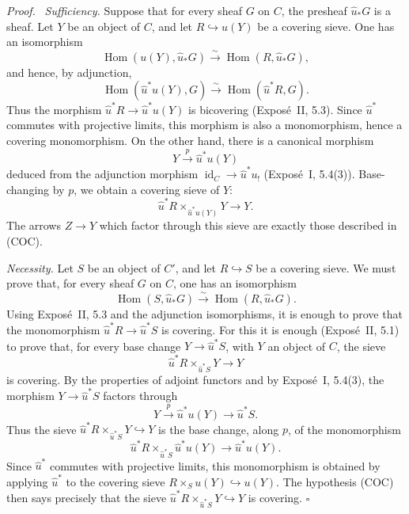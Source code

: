 \documentclass[11pt]{article}
\newcommand{\Hom}{\operatorname{Hom}}
\newcommand{\id}{\operatorname{id}}
\newcommand{\qedtext}{\hfill\(\square\)}
\newenvironment{prooftext}{\par\noindent\emph{Proof.}\ }{\par\medskip}
\begin{document}
\begin{prooftext}
\emph{Sufficiency.} Suppose that for every sheaf \(G\) on \(C\), the presheaf \(\widehat u_*G\) is a sheaf. Let \(Y\) be an object of \(C\), and let \(R\hookrightarrow u(Y)\) be a covering sieve. One has an isomorphism
\[
\Hom(u(Y),\widehat u_*G)\xrightarrow{\sim}\Hom(R,\widehat u_*G),
\]
and hence, by adjunction,
\[
\Hom(\widehat u^*u(Y),G)\xrightarrow{\sim}\Hom(\widehat u^*R,G).
\]
Thus the morphism \(\widehat u^*R\to\widehat u^*u(Y)\) is bicovering (Expos\'e~II, 5.3). Since \(\widehat u^*\) commutes with projective limits, this morphism is also a monomorphism, hence a covering monomorphism. On the other hand, there is a canonical morphism
\[
Y\xrightarrow{p}\widehat u^*u(Y)
\]
deduced from the adjunction morphism \(\id_C\to\widehat u^*u_!\) (Expos\'e~I, 5.4(3)). Base-changing by \(p\), we obtain a covering sieve of \(Y\):
\[
\widehat u^*R\times_{\widehat u^*u(Y)}Y\longrightarrow Y.
\]
The arrows \(Z\to Y\) which factor through this sieve are exactly those described in (COC).

\emph{Necessity.} Let \(S\) be an object of \(C'\), and let \(R\hookrightarrow S\) be a covering sieve. We must prove that, for every sheaf \(G\) on \(C\), one has an isomorphism
\[
\Hom(S,\widehat u_*G)\xrightarrow{\sim}\Hom(R,\widehat u_*G).
\]
Using Expos\'e~II, 5.3 and the adjunction isomorphisms, it is enough to prove that the monomorphism \(\widehat u^*R\to\widehat u^*S\) is covering. For this it is enough (Expos\'e~II, 5.1) to prove that, for every base change \(Y\to\widehat u^*S\), with \(Y\) an object of \(C\), the sieve
\[
\widehat u^*R\times_{\widehat u^*S}Y\longrightarrow Y
\]
is covering. By the properties of adjoint functors and by Expos\'e~I, 5.4(3), the morphism \(Y\to\widehat u^*S\) factors through
\[
Y\xrightarrow{p}\widehat u^*u(Y)\longrightarrow\widehat u^*S.
\]
Thus the sieve \(\widehat u^*R\times_{\widehat u^*S}Y\hookrightarrow Y\) is the base change, along \(p\), of the monomorphism
\[
\widehat u^*R\times_{\widehat u^*S}\widehat u^*u(Y)
\longrightarrow \widehat u^*u(Y).
\]
Since \(\widehat u^*\) commutes with projective limits, this monomorphism is obtained by applying \(\widehat u^*\) to the covering sieve \(R\times_Su(Y)\hookrightarrow u(Y)\). The hypothesis (COC) then says precisely that the sieve \(\widehat u^*R\times_{\widehat u^*S}Y\hookrightarrow Y\) is covering. \qedtext
\end{prooftext}
\end{document}
